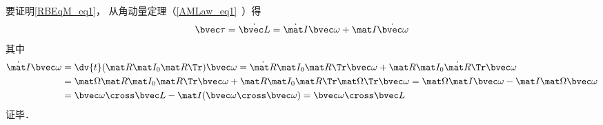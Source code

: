 要证明\autoref{RBEqM_eq1}， 从角动量定理（\autoref{AMLaw_eq1}~）得
\begin{equation}\label{RBEqM_eq3}
\bvec \tau = \dot{\bvec L} = \dot{\mat I} \bvec\omega + \mat I \dot{\bvec\omega}
\end{equation}
其中
\begin{equation}
\begin{aligned}
\dot{\mat I}\bvec\omega &= \dv{t}(\mat R \mat I_0 \mat R\Tr)\bvec\omega
= \dot{\mat R} \mat I_0 \mat R\Tr \bvec\omega + \mat R \mat I_0 \dot{\mat R}\Tr \bvec\omega\\
&= \mat \Omega \mat R \mat I_0 \mat R\Tr \bvec\omega + \mat R \mat I_0 \mat R\Tr \mat \Omega\Tr \bvec\omega
= \mat \Omega \mat I \bvec\omega - \mat I \mat \Omega \bvec\omega\\
&= \bvec \omega \cross \bvec L - \mat I (\bvec\omega\cross\bvec\omega)
= \bvec \omega \cross \bvec L
\end{aligned}
\end{equation}
证毕．
